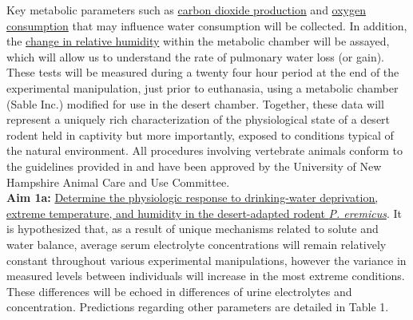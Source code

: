 \documentclass[12pt]{article}
\begin{document}
Key metabolic parameters such as \ul{carbon dioxide production} and \ul{oxygen consumption} that may influence water consumption will be collected. In addition, the \ul{change in relative humidity} within the metabolic chamber will be assayed, which will allow us to understand the rate of pulmonary water loss (or gain). These tests will be measured during a twenty four hour period at the end of the experimental manipulation, just prior to euthanasia, using a metabolic chamber (Sable Inc.) modified for use in the desert chamber. Together, these data will represent a uniquely rich characterization of the physiological state of a desert rodent held in captivity but more importantly, exposed to conditions typical of the natural environment. All procedures involving vertebrate animals conform to the guidelines provided in \citep{Sikes:2011dz} and have been approved by the University of New Hampshire Animal Care and Use Committee. \\

\noindent \textbf{Aim 1a:} \ul{Determine the physiologic response to drinking-water deprivation, extreme temperature, and humidity in the desert-adapted rodent \textit{P. eremicus}}. It is hypothesized that, as a result of unique mechanisms related to solute and water balance, average serum electrolyte concentrations will remain relatively constant throughout various experimental manipulations, however the variance in measured levels between individuals will increase in the most extreme conditions. These differences will be echoed in differences of urine electrolytes and concentration. Predictions regarding other parameters are detailed in Table 1. \\
\end{document}
